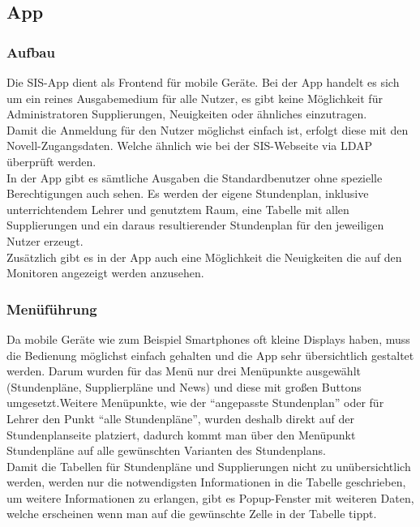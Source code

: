 \subsection{App}
\subsubsection{Aufbau}
Die SIS-App dient als Frontend für mobile Geräte. Bei der App handelt es sich um ein reines Ausgabemedium für alle Nutzer, es gibt keine Möglichkeit für Administratoren Supplierungen, Neuigkeiten oder ähnliches einzutragen.\\
Damit die Anmeldung für den Nutzer möglichst einfach ist, erfolgt diese mit den Novell-Zugangsdaten. Welche ähnlich wie bei der SIS-Webseite via LDAP überprüft werden.\\
In der App gibt es sämtliche Ausgaben die Standardbenutzer ohne spezielle Berechtigungen auch sehen. Es werden der eigene Stundenplan, inklusive unterrichtendem Lehrer und genutztem Raum, eine Tabelle mit allen Supplierungen und ein daraus resultierender Stundenplan für den jeweiligen Nutzer erzeugt.\\
Zusätzlich gibt es in der App auch eine Möglichkeit die Neuigkeiten die auf den Monitoren angezeigt werden anzusehen.\\

\subsubsection{Menüführung}

Da mobile Geräte wie zum Beispiel Smartphones oft kleine Displays haben, muss die Bedienung möglichst einfach gehalten und die App sehr übersichtlich gestaltet werden. Darum wurden für das Menü nur drei Menüpunkte ausgewählt (Stundenpläne, Supplierpläne und News) und diese mit großen Buttons umgesetzt.Weitere Menüpunkte, wie der \enquote{angepasste Stundenplan} oder für Lehrer den Punkt \enquote{alle Stundenpläne}, wurden deshalb direkt auf der Stundenplanseite platziert, dadurch kommt man über den Menüpunkt Stundenpläne auf alle gewünschten Varianten des Stundenplans.\\
Damit die Tabellen für Stundenpläne und Supplierungen nicht zu unübersichtlich werden, werden nur die notwendigsten Informationen in die Tabelle geschrieben, um weitere Informationen zu erlangen, gibt es Popup-Fenster mit weiteren Daten, welche erscheinen wenn man auf die gewünschte Zelle in der Tabelle tippt.\\



